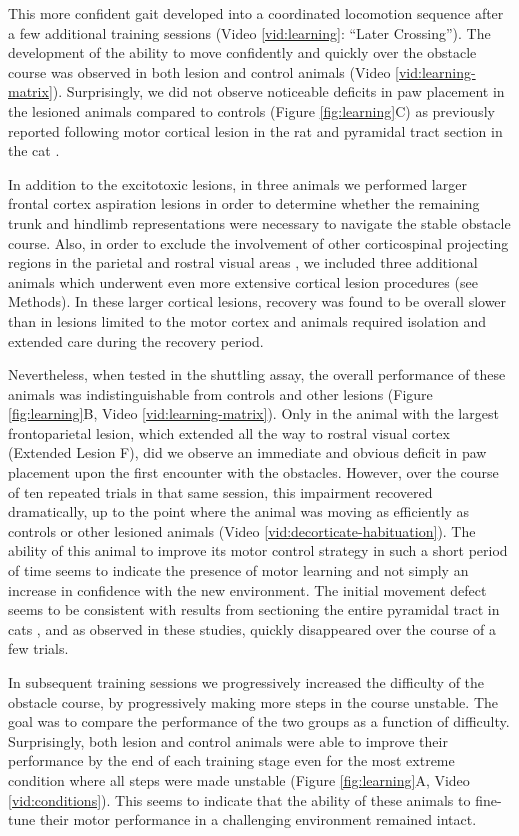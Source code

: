 This more confident gait developed into a coordinated locomotion sequence after a few additional training sessions (Video \ref{vid:learning}: ``Later Crossing''). The development of the ability to move confidently and quickly over the obstacle course was observed in both lesion and control animals (Video \ref{vid:learning-matrix}). Surprisingly, we did not observe noticeable deficits in paw placement in the lesioned animals compared to controls (Figure \ref{fig:learning}C) as previously reported following motor cortical lesion in the rat \cite{Metz2002} and pyramidal tract section in the cat \cite{Liddell1944}.

In addition to the excitotoxic lesions, in three animals we performed larger frontal cortex aspiration lesions in order to determine whether the remaining trunk and hindlimb representations were necessary to navigate the stable obstacle course. Also, in order to exclude the involvement of other corticospinal projecting regions in the parietal and rostral visual areas \cite{Miller1987}, we included three additional animals which underwent even more extensive cortical lesion procedures (see Methods). In these larger cortical lesions, recovery was found to be overall slower than in lesions limited to the motor cortex and animals required isolation and extended care during the recovery period.

Nevertheless, when tested in the shuttling assay, the overall performance of these animals was indistinguishable from controls and other lesions (Figure \ref{fig:learning}B, Video \ref{vid:learning-matrix}). Only in the animal with the largest frontoparietal lesion, which extended all the way to rostral visual cortex (Extended Lesion F), did we observe an immediate and obvious deficit in paw placement upon the first encounter with the obstacles. However, over the course of ten repeated trials in that same session, this impairment recovered dramatically, up to the point where the animal was moving as efficiently as controls or other lesioned animals (Video \ref{vid:decorticate-habituation}). The ability of this animal to improve its motor control strategy in such a short period of time seems to indicate the presence of motor learning and not simply an increase in confidence with the new environment. The initial movement defect seems to be consistent with results from sectioning the entire pyramidal tract in cats \cite{Liddell1944}, and as observed in these studies, quickly disappeared over the course of a few trials.

In subsequent training sessions we progressively increased the difficulty of the obstacle course, by progressively making more steps in the course unstable. The goal was to compare the performance of the two groups as a function of difficulty. Surprisingly, both lesion and control animals were able to improve their performance by the end of each training stage even for the most extreme condition where all steps were made unstable (Figure \ref{fig:learning}A, Video \ref{vid:conditions}). This seems to indicate that the ability of these animals to fine-tune their motor performance in a challenging environment remained intact.

